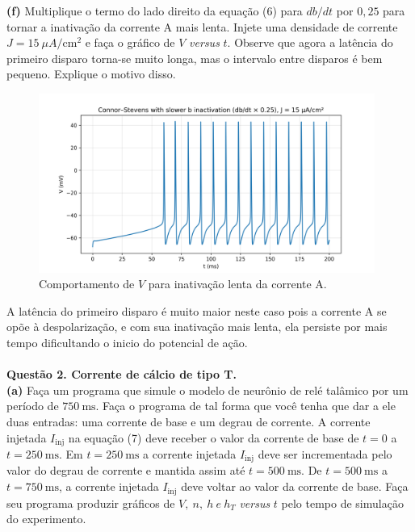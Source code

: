 \documentclass[english,11pt,a4paper]{article}
\begin{document}
	
	
	\noindent \textbf{(f)} Multiplique o termo do lado direito da equação (6) para $db/dt$ por $0{,}25$ para tornar a inativação da corrente A mais lenta. Injete uma densidade de corrente $J = 15 \ \mu A/\text{cm}^2$ e faça o gráfico de $V$ \textit{versus} $t$. Observe que agora a latência do primeiro disparo torna-se muito longa, mas o intervalo entre disparos é bem pequeno. Explique o motivo disso.\\
	
		\begin{figure}[H]
		\centering
		\includegraphics[width=11cm]{../figures/ex_1f.png}	
		\caption{Comportamento de $V$ para inativação lenta da corrente A.}
		\end{figure}
	
	A latência do primeiro disparo é muito maior neste caso pois a corrente A se opõe à despolarização, e com sua inativação mais lenta, ela persiste por mais tempo dificultando o inicio do potencial de ação.\\\\
	
	
	
	\noindent \textbf{Questão 2. Corrente de cálcio de tipo T.}\\
	
	\noindent \textbf{(a)} Faça um programa que simule o modelo de neurônio de relé talâmico por um período de $750 \ \text{ms}$. Faça o programa de tal forma que você tenha que dar a ele duas entradas: uma corrente de base e um degrau de corrente. A corrente injetada $I_{\text{inj}}$ na equação (7) deve receber o valor da corrente de base de $t = 0$ a $t = 250 \ \text{ms}$. Em $t = 250 \ \text{ms}$ a corrente injetada $I_{\text{inj}}$ deve ser incrementada pelo valor do degrau de corrente e mantida assim até $t = 500 \ \text{ms}$. De $t = 500 \ \text{ms}$ a $t = 750 \ \text{ms}$, a corrente injetada $I_{\text{inj}}$ deve voltar ao valor da corrente de base. Faça seu programa produzir gráficos de $V, \ n, \ h \ e \ h_T$ \textit{versus} $t$ pelo tempo de simulação do experimento.\\
	
\end{document}
